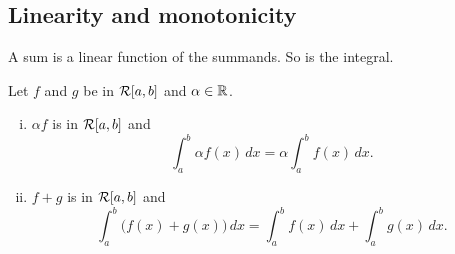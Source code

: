 \subsection{Linearity and monotonicity}

A sum is a linear function of the summands.  So is the integral.

\begin{prop}[Linearity]
\label{prop:integrallinear}
Let $f$ and $g$ be in ${\mathcal{R}}[a,b]$ and $\alpha \in {\mathbb{R}}$.
\begin{enumerate}[(i)]
\item $\alpha f$ is in ${\mathcal{R}}[a,b]$ and
\begin{equation*}
\int_a^b \alpha f(x) \,dx = \alpha \int_a^b f(x) \,dx .
\end{equation*}
\item $f+g$ is in ${\mathcal{R}}[a,b]$ and
\begin{equation*}
\int_a^b \bigl( f(x)+g(x) \bigr) \,dx = 
\int_a^b f(x) \,dx 
+
\int_a^b g(x) \,dx .
\end{equation*}
\end{enumerate}
\end{prop}

